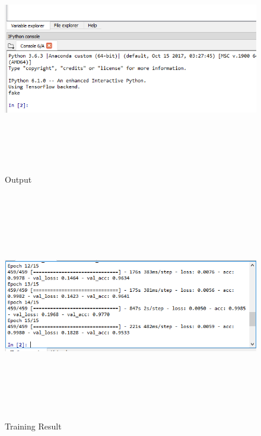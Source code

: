 \documentclass[a4paper,12pt,oneside]{article}
\begin{document}
\begin{figure}[H]
\centering
\includegraphics[height=10cm,width=15cm]{fingerout.png}
\caption{Output }
\end{figure}



\begin{figure}[H]
\centering
\includegraphics[height=10cm,width=15cm]{trainphto.PNG}
\caption{Training Result }
\end{figure}
\end{document}
